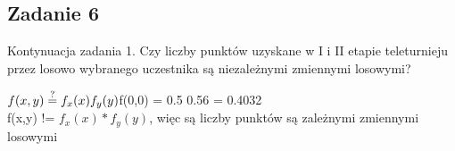 \subsection{Zadanie 6}

Kontynuacja zadania 1.
Czy liczby punktów uzyskane w I i II etapie teleturnieju przez losowo wybranego uczestnika są niezależnymi zmiennymi losowymi?

$f(x,y) \stackrel{?}{=} f_x(x)f_y(y) \\

$f(0,0) = 0.5  0.56  = 0.4032 \\

f(x,y) != $f_x(x)*f_y(y)$, więc są liczby punktów są zależnymi zmiennymi losowymi
